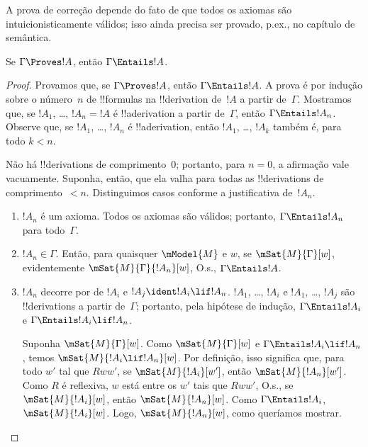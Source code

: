 \documentclass[../../../include/open-logic-section]{subfiles}
\begin{document}


\begin{editorial}
  A prova de correção depende do fato de que todos os axiomas são
  intuicionisticamente válidos; isso ainda precisa ser provado, p.ex., no capítulo de semântica.
\end{editorial}

\begin{thm}[Correção]
  Se $\Gamma \Proves !A$, então $ \Gamma \Entails !A$.
\end{thm}

\begin{proof}
  Provamos que, se $\Gamma \Proves !A$, então $\Gamma \Entails !A$.
  A prova é por indução sobre o número~$n$ de !!{formula}s na
  !!{derivation} de~$!A$ a partir de~$\Gamma$. Mostramos que, se
  $!A_1$, \dots, $!A_n = !A$ é !!a{derivation} a partir de~$\Gamma$,
  então $\Gamma \Entails !A_n$. Observe que, se $!A_1$, \dots,
  $!A_n$ é !!a{derivation}, então $!A_1$, \dots, $!A_k$ também é, para
  todo $k<n$.

  Não há !!{derivation}s de comprimento~$0$; portanto, para $n=0$, a
  afirmação vale vacuamente. Suponha, então, que ela valha para todas
  as !!{derivation}s de comprimento~$<n$. Distinguimos casos conforme
  a justificativa de~$!A_n$.
  
  \begin{enumerate}
  \item $!A_n$ é um axioma. Todos os axiomas são válidos; portanto,
    $\Gamma \Entails !A_n$ para todo~$\Gamma$.
  \item $!A_n \in \Gamma$. Então, para quaisquer $\mModel{M}$ e $w$,
    se $\mSat{M}{\Gamma}[w]$, evidentemente
    $\mSat{M}{\Gamma}{!A_n}[w]$, O.s.\@, $\Gamma \Entails !A$.
  \item $!A_n$ decorre por \MP{} de $!A_i$ e
    $!A_j \ident !A_i \lif !A_n$. $!A_1$, \dots, $!A_i$ e $!A_1$,
    \dots, $!A_j$ são !!{derivation}s a partir de~$\Gamma$; portanto,
    pela hipótese de indução, $\Gamma \Entails !A_i$ e
    $\Gamma \Entails !A_i \lif !A_n$.
    
    Suponha $\mSat{M}{\Gamma}[w]$. Como $\mSat{M}{\Gamma}[w]$ e
    $\Gamma \Entails !A_i \lif !A_n$, temos $\mSat{M}{!A_i \lif
      !A_n}[w]$. Por definição, isso significa que, para todo $w'$ tal
    que $Rww'$, se $\mSat{M}{!A_i}[w']$, então
    $\mSat{M}{!A_n}[w']$. Como $R$ é reflexiva, $w$ está entre os $w'$
    tais que $Rww'$, O.s.\@, se $\mSat{M}{!A_i}[w]$, então
    $\mSat{M}{!A_n}[w]$. Como $\Gamma \Entails !A_i$,
    $\mSat{M}{!A_i}[w]$. Logo, $\mSat{M}{!A_n}[w]$, como queríamos
    mostrar.
  \end{enumerate}
\end{proof}
\end{document}
